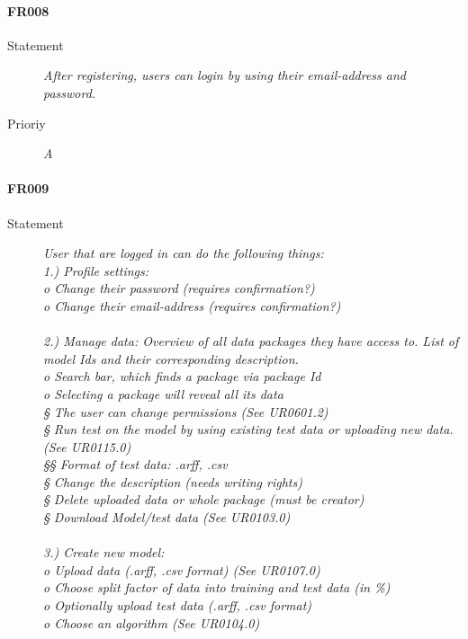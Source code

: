\paragraph{FR008}
\begin{description}
  \item [Statement]
    \textit{
After registering, users can login by using their email-address and password.
}
  \item [Prioriy] \textit{A}
\end{description}

\paragraph{FR009}
\begin{description}
  \item [Statement]
    \textit{
User that are logged in can do the following things:
\\1.) Profile settings:
\\o   Change their password (requires confirmation?)
\\o   Change their email-address (requires confirmation?)
\\
\\2.) Manage data: Overview of all data packages they have access to. List of model Ids and their corresponding description.
\\o   Search bar, which finds a package via package Id
\\o   Selecting a package will reveal all its data
\\§  The user can change permissions (See UR0601.2)
\\§  Run test on the model by using existing test data or uploading new data. (See UR0115.0)
\\§§ Format of test data: .arff, .csv
\\§  Change the description (needs writing rights)
\\§  Delete uploaded data or whole package (must be creator)
\\§ Download \gls{Model}/\gls{test data} (See UR0103.0)
\\
\\3.) Create new model: 
\\o   Upload data (.arff, .csv format)  (See UR0107.0)
\\o   Choose split factor of data into training and test data (in \%)
\\o   Optionally upload test data (.arff, .csv format)
\\o   Choose an algorithm (See UR0104.0)
}
\end{description}
